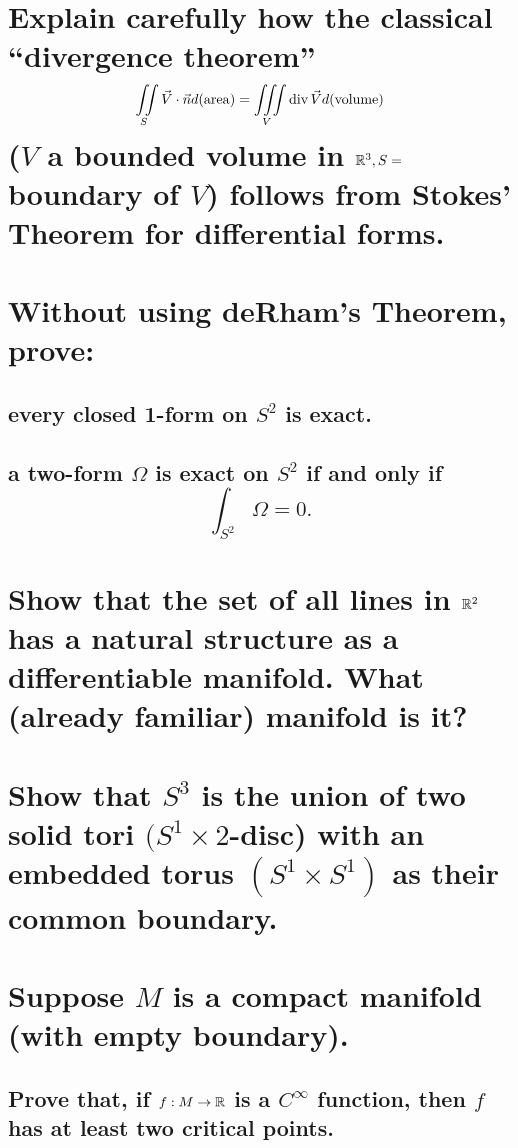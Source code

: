 \documentclass[10pt]{article}
\begin{document}
 

\section{Explain carefully how the classical ``divergence theorem''
$$\iint\limits_S \vec{V} \cdot \vec{n} d(\mathrm{area}) = \iiint\limits_V \operatorname{div} \vec{V} d(\mathrm{volume})$$
($V$ a bounded volume in $\mathbb{R}^3, S= $ boundary of $V$) follows from Stokes' Theorem for
differential forms.}

\section{Without using deRham's Theorem, prove:}

\subsection{every closed 1-form on $S^2$ is exact.}

\subsection{a two-form $\Omega$ is exact on $S^2$ if and only if 
$$\int_{S^2}\Omega=0.$$}

\section{Show that the set of all lines in $\mathbb{R}^2$ has a natural structure as a
  differentiable manifold. What (already familiar) manifold is it?}

\section{Show that $S^3$ is the union of two solid tori $(S^1 \times 2$-disc) with an embedded torus
  $(S^1 \times S^1)$ as their common boundary. }

\section{Suppose $M$ is a compact manifold (with empty boundary).}

\subsection{Prove that, if $f: M \to \mathbb{R}$ is a $C^\infty$ function, then $f$ has at least two
critical points.}
\end{document}
